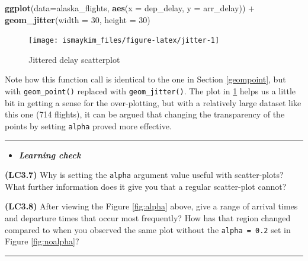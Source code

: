 \documentclass[]{tufte-book}
\newenvironment{Shaded}{\begin{snugshade}}{\end{snugshade}}
\newcommand{\KeywordTok}[1]{\textcolor[rgb]{0.13,0.29,0.53}{\textbf{{#1}}}}
\newcommand{\DataTypeTok}[1]{\textcolor[rgb]{0.13,0.29,0.53}{{#1}}}
\newcommand{\DecValTok}[1]{\textcolor[rgb]{0.00,0.00,0.81}{{#1}}}
\newcommand{\StringTok}[1]{\textcolor[rgb]{0.31,0.60,0.02}{{#1}}}
\newcommand{\NormalTok}[1]{{#1}}
\let\oldrule=\rule
\renewcommand{\rule}[1]{\oldrule{\linewidth}}
\newenvironment{rmdblock}[1]
  {\begin{shaded*}
  \begin{itemize}
  \renewcommand{\labelitemi}{
    \raisebox{-.7\height}[0pt][0pt]{
    }
  }
  \item
  }
  {
  \end{itemize}
  \end{shaded*}
  }
\newenvironment{learncheck}
  {\begin{rmdblock}{warning}}
  {\end{rmdblock}}
\begin{document}
\begin{Shaded}
\begin{Highlighting}[]
\KeywordTok{ggplot}\NormalTok{(}\DataTypeTok{data=}\NormalTok{alaska_flights, }\KeywordTok{aes}\NormalTok{(}\DataTypeTok{x =} \NormalTok{dep_delay, }\DataTypeTok{y =} \NormalTok{arr_delay)) +}\StringTok{ }
\StringTok{  }\KeywordTok{geom_jitter}\NormalTok{(}\DataTypeTok{width =} \DecValTok{30}\NormalTok{, }\DataTypeTok{height =} \DecValTok{30}\NormalTok{)}
\end{Highlighting}
\end{Shaded}

\begin{figure}

{\centering \texttt{[image: ismaykim\_files/figure-latex/jitter-1]} 

}

\caption[Jittered delay scatterplot]{Jittered delay scatterplot}\label{fig:jitter}
\end{figure}

Note how this function call is identical to the one in Section
\ref{geompoint}, but with \texttt{geom\_point()} replaced with
\texttt{geom\_jitter()}. The plot in \ref{fig:jitter} helps us a little
bit in getting a sense for the over-plotting, but with a relatively
large dataset like this one (714 flights), it can be argued that
changing the transparency of the points by setting \texttt{alpha} proved
more effective.

\begin{center}\rule{0.5\linewidth}{\linethickness}\end{center}

\begin{learncheck}
\textbf{\emph{Learning check}}
\end{learncheck}

\textbf{(LC3.7)} Why is setting the \texttt{alpha} argument value useful
with scatter-plots? What further information does it give you that a
regular scatter-plot cannot?

\textbf{(LC3.8)} After viewing the Figure \ref{fig:alpha} above, give a
range of arrival times and departure times that occur most frequently?
How has that region changed compared to when you observed the same plot
without the \texttt{alpha\ =\ 0.2} set in Figure \ref{fig:noalpha}?

\begin{center}\rule{0.5\linewidth}{\linethickness}\end{center}
\end{document}
